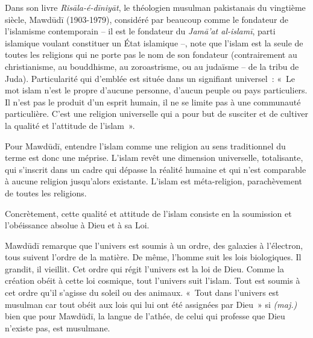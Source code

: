 Dans son livre \emph{Risāla-é-dīniyāt}, le théologien musulman
pakistanais du vingtième siècle, Mawdūdī (1903-1979), considéré par
beaucoup comme le fondateur de l'islamisme contemporain -- il est le fondateur du \emph{Jamā'at
al-islamī}, parti islamique voulant constituer un État islamique --,
note que l'islam est la seule de toutes les religions qui ne porte pas
le nom de son fondateur (contrairement au christianisme, au bouddhisme, au zoroastrisme,
ou au judaïsme -- de la tribu de Juda). Particularité qui d'emblée est
située dans un signifiant universel~: «~Le mot islam n'est le propre
d'aucune personne, d'aucun peuple ou pays particuliers. Il n'est pas le
produit d'un esprit humain, il ne se limite pas à une communauté
particulière. C'est une religion universelle qui a pour but de susciter
et de cultiver la qualité et l'attitude de l'islam~».

Pour Mawdūdī, entendre l'islam comme une religion au sens traditionnel
du terme est donc une méprise. L'islam revêt une dimension universelle,
totalisante, qui s'inscrit dans un cadre qui dépasse la réalité humaine
et qui n'est comparable à aucune religion jusqu'alors existante. L'islam
est méta-religion, parachèvement de toutes les religions.

Concrètement, cette qualité et attitude de l'islam consiste en la
soumission et l'obéissance absolue à Dieu et à sa Loi.

Mawdūdī remarque que l'univers est soumis à un ordre, des galaxies à
l'électron, tous suivent l'ordre de la matière. De même, l'homme suit
les lois biologiques. Il grandit, il vieillit. Cet ordre qui régit
l'univers est la loi de Dieu. Comme la création obéit à cette loi
cosmique, tout l'univers suit l'islam. Tout est soumis à cet ordre qu'il
s'agisse du soleil ou des animaux. «~Tout dans l'univers est musulman
car tout obéit aux lois qui lui ont été assignées par Dieu~» si \emph{(maj.)} bien que pour Mawdūdī, la langue de l'athée,
de celui qui professe que Dieu n'existe pas, est musulmane.


